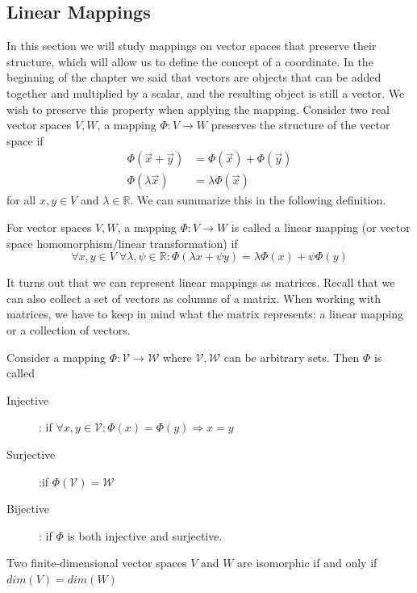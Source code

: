\subsection{Linear Mappings}
In this section we will study mappings on vector spaces that preserve their structure, which will allow us to define the concept of a coordinate. In the beginning of the chapter we said that vectors are objects that can be added together and multiplied by a scalar, and the resulting object is still a vector. We wish to preserve this property when applying the mapping. Consider two real vector spaces $V,W$, a mapping $\Phi : V \longrightarrow W $ preserves the structure of the vector space if
\begin{align}
    \Phi(\vec{x}+\vec{y}) &= \Phi(\vec{x})+\Phi(\vec{y})\\
    \Phi(\lambda \vec{x}) &= \lambda \Phi(\vec{x})
\end{align}
for all $x,y \in V$ and $\lambda \in \mathbb{R}$. We can summarize this in the following definition.
\begin{definition}
    For vector spaces $V,W$, a mapping $\Phi : V \longrightarrow W$ is called a linear mapping (or vector space homomorphism/linear transformation) if
    \[
        \forall x,y \in V \; \forall \lambda,\psi \in \mathbb{R}: \Phi(\lambda x+\psi y) = \lambda\Phi(x)+\psi \Phi(y)
    \]
\end{definition}
It turns out that we can represent linear mappings as matrices. Recall that we can also collect a set of vectors as columns of a matrix. When working with matrices, we have to keep in mind what the matrix represents: a linear mapping or a collection of vectors.
\begin{definition}
    Consider a mapping $\Phi : \mathcal{V} \longrightarrow \mathcal{W}$ where $\mathcal{V},\mathcal{W}$ can be arbitrary sets. Then $\Phi$ is called
    \begin{description}
        \item[Injective]: if $\forall x,y \in \mathcal{V}: \Phi(x) = \Phi(y) \Longrightarrow x = y$
        \item[Surjective]:if $\Phi(\mathcal{V}) = \mathcal{W}$
        \item[Bijective]: if $\Phi$ is both injective and surjective.  
    \end{description}
\end{definition}
\begin{theorem}
    Two finite-dimensional vector spaces $V$ and $W$ are isomorphic if and only if $dim(V) = dim(W)$
\end{theorem}
